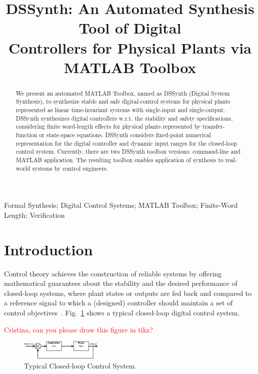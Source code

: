 \documentclass[10pt,conference]{IEEEtran}
\begin{document}
\title{DSSynth: An Automated Synthesis Tool of Digital \\ Controllers for Physical Plants via MATLAB Toolbox}


\maketitle

\begin{abstract}
We present an automated MATLAB Toolbox, named as DSSynth 
(Digital System Synthesis), to synthesize stable and safe digital-control 
systems for physical plants represented as linear time-invariant
systems with single-input and single-output. DSSynth synthesizes digital 
controllers w.r.t. the stability and safety specifications, considering finite word-length 
effects for physical plants represented by transfer-function or state-space 
equations. DSSynth considers fixed-point numerical representation for the 
digital controller and dynamic input ranges for the closed-loop control system. 
Currently, there are two DSSynth toolbox versions: command-line and 
MATLAB application. The resulting toolbox enables application of synthesis to 
real-world systems by control engineers.
\end{abstract}

%
%
\begin{IEEEkeywords}
Formal Synthesis; Digital Control Systems; MATLAB Toolbox; Finite-Word Length; Verification
\end{IEEEkeywords}

\section{Introduction}

Control theory achieves the construction of reliable systems by 
offering mathematical guarantees about the stability and the desired 
performance of closed-loop systems, where plant states or outputs 
are fed back and compared to a reference signal to which a (designed) 
controller should maintain a set of control objectives~\cite{astrom1997computer}. 
Fig.~\ref{fig:typical-control-system} shows a typical closed-loop digital control system.

\textcolor{red}{Cristina, can you please draw this figure in tikz?}
\begin{figure}[ht!]
\centering
\includegraphics[width=0.35\textwidth]{closedloopseries.pdf}
\caption{Typical Closed-loop Control System.}
\label{fig:typical-control-system}
\end{figure}
\end{document}
